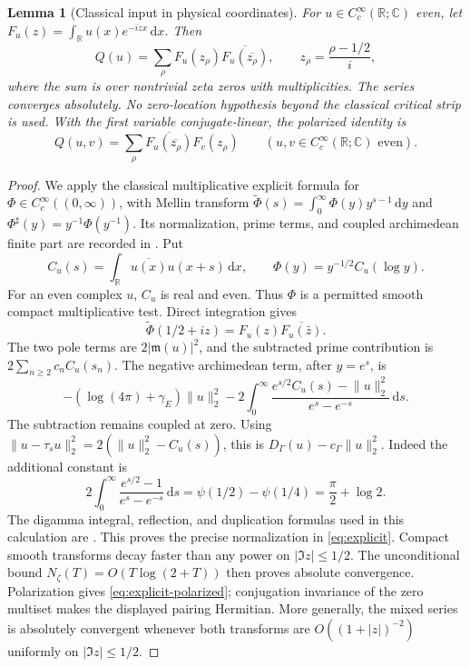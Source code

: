 \documentclass[11pt,a4paper]{article}
\newcommand{\R}{\mathbb R}
\newcommand{\C}{\mathbb C}
\newcommand{\norm}[1]{\lVert #1\rVert}
\newcommand{\abs}[1]{\lvert #1\rvert}
\newcommand{\dd}{\,\mathrm d}
\newtheorem{lemma}[theorem]{Lemma}
\theoremstyle{definition}
\theoremstyle{remark}
\numberwithin{equation}{section}
\begin{document}
\begin{lemma}[Classical input in physical coordinates]\label{lem:explicit}
For $u\in C_c^\infty(\R;\C)$ even, let
$F_u(z)=\int_\R u(x)e^{-izx}\dd x$. Then
\begin{equation}\label{eq:explicit}
 Q(u)=\sum_{\rho}
    F_u(z_\rho)\overline{F_u(\overline{z_\rho})},
 \qquad z_\rho=\frac{\rho-1/2}{i},
\end{equation}
where the sum is over nontrivial zeta zeros with multiplicities. The series
converges absolutely. No zero-location hypothesis beyond the classical
critical strip is used.
With the first variable conjugate-linear, the polarized identity is
\begin{equation}\label{eq:explicit-polarized}
 Q(u,v)=\sum_\rho
       \overline{F_u(\overline{z_\rho})}F_v(z_\rho)
 \qquad(u,v\in C_c^\infty(\R;\C)\text{ even}).
\end{equation}
\end{lemma}
\begin{proof}
We apply the classical multiplicative explicit formula for
$\Phi\in C_c^\infty((0,\infty))$, with Mellin transform
$\widetilde\Phi(s)=\int_0^\infty\Phi(y)y^{s-1}\dd y$ and
$\Phi^\sharp(y)=y^{-1}\Phi(y^{-1})$. Its normalization, prime terms,
and coupled archimedean finite part are recorded in
\cite[Appendix B, Eqs.~(147)--(150)]{connesconsani}. Put
\[
 C_u(s)=\int_\R\overline{u(x)}u(x+s)\dd x,
 \qquad \Phi(y)=y^{-1/2}C_u(\log y).
\]
For an even complex $u$, $C_u$ is real and even. Thus $\Phi$ is a permitted
smooth compact multiplicative test. Direct integration gives
\[
 \widetilde\Phi(1/2+iz)
       =F_u(z)\overline{F_u(\bar z)}.
\]
The two pole terms are $2\abs{\mathfrak m(u)}^2$, and the subtracted prime
contribution is $2\sum_{n\ge2}c_n C_u(s_n)$. The negative archimedean
term, after $y=e^s$, is
\begin{equation}\label{eq:archimedean}
 - (\log(4\pi)+\gamma_E)\norm u_2^2
 -2\int_0^\infty
       \frac{e^{s/2}C_u(s)-\norm u_2^2}{e^s-e^{-s}}\dd s.
\end{equation}
The subtraction remains coupled at zero. Using
$\norm{u-\tau_su}_2^2=2(\norm u_2^2-C_u(s))$, this is
$D_\Gamma(u)-c_\Gamma\norm u_2^2$. Indeed the additional constant is
\begin{equation}\label{eq:gamma-constant}
 2\int_0^\infty\frac{e^{s/2}-1}{e^s-e^{-s}}\dd s
   =\psi(1/2)-\psi(1/4)=\frac\pi2+\log2.
\end{equation}
The digamma integral, reflection, and duplication formulas used in this
calculation are \cite[Eqs.~5.9.16, 5.5.4, 5.5.8]{dlmf}.
This proves the precise normalization in \eqref{eq:explicit}.
Compact smooth transforms decay faster than any power on
$\abs{\Im z}\le1/2$. The unconditional bound
$N_\zeta(T)=O(T\log(2+T))$ then proves absolute convergence.
Polarization gives \eqref{eq:explicit-polarized}; conjugation invariance of
the zero multiset makes the displayed pairing Hermitian. More generally,
the mixed series is absolutely convergent whenever both transforms are
$O((1+\abs z)^{-2})$ uniformly on $\abs{\Im z}\le1/2$.
\end{proof}
\end{document}
